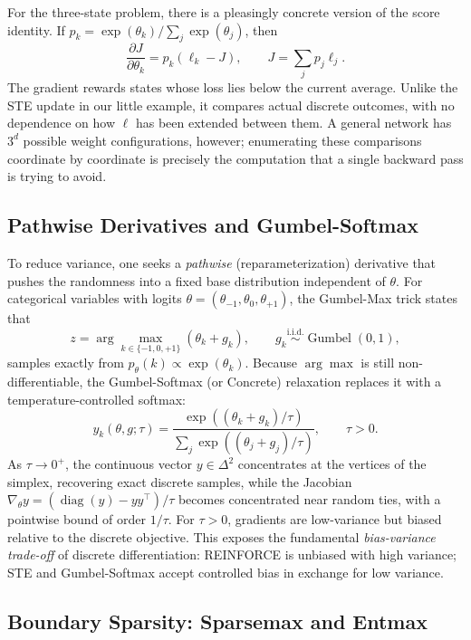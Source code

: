 For the three-state problem, there is a pleasingly concrete version of the score identity. If $p_k=\exp(\theta_k)/\sum_j\exp(\theta_j)$, then
\[
 \frac{\partial J}{\partial\theta_k}
       =p_k(\ell_k-J),\qquad J=\sum_j p_j\ell_j.
\]
The gradient rewards states whose loss lies below the current average. Unlike the STE update in our little example, it compares actual discrete outcomes, with no dependence on how $\ell$ has been extended between them. A general network has $3^d$ possible weight configurations, however; enumerating these comparisons coordinate by coordinate is precisely the computation that a single backward pass is trying to avoid.

\subsection{Pathwise Derivatives and Gumbel-Softmax}

To reduce variance, one seeks a \emph{pathwise} (reparameterization) derivative that pushes the randomness into a fixed base distribution independent of $\theta$. For categorical variables with logits $\theta = (\theta_{-1}, \theta_0, \theta_{+1})$, the Gumbel-Max trick states that
\[
    z = \arg\max_{k \in \{-1, 0, +1\}} (\theta_k + g_k), \qquad g_k \overset{\text{i.i.d.}}{\sim} \operatorname{Gumbel}(0, 1),
\]
samples exactly from $p_\theta(k) \propto \exp(\theta_k)$. Because $\arg\max$ is still non-differentiable, the Gumbel-Softmax (or Concrete) relaxation replaces it with a temperature-controlled softmax:
\begin{equation}
    y_k(\theta, g; \tau) = \frac{\exp((\theta_k + g_k)/\tau)}{\sum_{j} \exp((\theta_j + g_j)/\tau)}, \qquad \tau > 0.
\end{equation}
As $\tau \to 0^+$, the continuous vector $y \in \Delta^2$ concentrates at the vertices of the simplex, recovering exact discrete samples, while the Jacobian $\nabla_\theta y=(\operatorname{diag}(y)-yy^\top)/\tau$ becomes concentrated near random ties, with a pointwise bound of order $1/\tau$. For $\tau > 0$, gradients are low-variance but biased relative to the discrete objective. This exposes the fundamental \emph{bias-variance trade-off} of discrete differentiation: REINFORCE is unbiased with high variance; STE and Gumbel-Softmax accept controlled bias in exchange for low variance.

\subsection{Boundary Sparsity: Sparsemax and Entmax}

